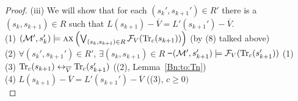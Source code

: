 \documentclass{article}
\begin{document}
\begin{proof}
        (iii) We will show that for each $(s_k', s_{k+1}') \in R'$ there is a $(s_k, s_{k+1})\in R$ such that $L(s_{k+1}) - \overline V = L'(s_{k+1}') - \overline V$.\\
        (1) $({\cal M}', s_k') \models \textsc{a} \textsc{x} \left(\bigvee_{(s_k,s_{k+1})\in R} {\cal F}_V(\textrm{Tr}_c(s_{k+1}))\right)$  \hfill (by (8) talked above)\\
        (2) $\forall (s_k', s_{k+1}') \in R'$, $\exists (s_k, s_{k+1}) \in R$ \st\ $({\cal M}', s_{k+1}') \models {\cal F}_V(\textrm{Tr}_c(s_{k+1}'))$  \hfill (1) \\
        (3) $\textrm{Tr}_c(s_{k+1}) \leftrightarrow_{\overline V} \textrm{Tr}_c(s_{k+1}')$    \hfill ((2), Lemma~\ref{Bn:to:Tn}) \\
        (4) $L(s_{k+1}) - \overline V = L'(s_{k+1}') - \overline V$  \hfill   ((3), $c \geq 0)$\\


\end{proof}
\end{document}
